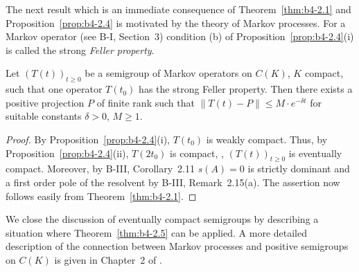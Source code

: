 %
%
The next result which is an immediate consequence of Theorem~\ref{thm:b4-2.1} and
Proposition~\ref{prop:b4-2.4} is motivated by the theory of Markov processes.
For a Markov operator (see B-I, Section~3) condition (b) of Proposition~\ref{prop:b4-2.4}(i) is called the strong \emph{Feller property}.

\begin{theorem}\label{thm:b4-2.5}
	Let $(T(t))_{t \geq 0}$ be a semigroup of Markov operators on
	$C(K)$, $K$ compact, such that one operator $T(t_{0})$ has the strong Feller
	property.
	Then there exists a positive projection $P$ of finite rank
	such that $\|T(t) - P\| \leq M\cdot e^{-\delta t}$ for suitable constants $\delta>0$, $M \geq 1$.
\end{theorem}

\begin{proof}
	By Proposition~\ref{prop:b4-2.4}(i), $T(t_{0})$ is weakly compact.
	Thus, by Proposition~\ref{prop:b4-2.4}(ii),
	$T(2t_{0})$ is compact, \ie, $(T(t))_{t \geq 0}$ is eventually compact.
	Moreover,
	by B-III, Corollary~2.11 $s(A) = 0$ is strictly dominant and a first order
	pole of the resolvent by B-III, Remark~2.15(a).
	The assertion now follows
	easily from Theorem~\ref{thm:b4-2.1}.
\end{proof}

We close the discussion of eventually compact semigroups by describing
a situation where Theorem~\ref{thm:b4-2.5} can be applied.
A more detailed description
of the connection between Markov processes and positive semigroups on
$C(K)$ is given in Chapter~2 of \citet{vancasteren:1985}.

